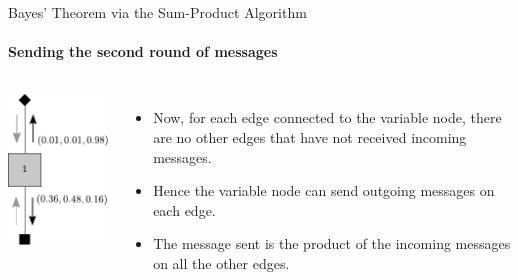 \documentclass[letter,graphicx]{beamer}
\begin{document}
\begin{frame}{Bayes' Theorem via the Sum-Product Algorithm}
\framesubtitle{Sending the second round of messages}

\begin{columns}
\includegraphics[height = 0.65\textheight]{./images/single-node-sum-product-c.pdf}
\begin{itemize}
\item Now,  for each edge connected to the variable node, there are no other edges that have not received incoming messages.
\item Hence the variable node can send outgoing messages on each edge.
\item The message sent is the product of the incoming messages on all the other edges.
\end{itemize}
\end{columns}
\end{frame}
\end{document}
